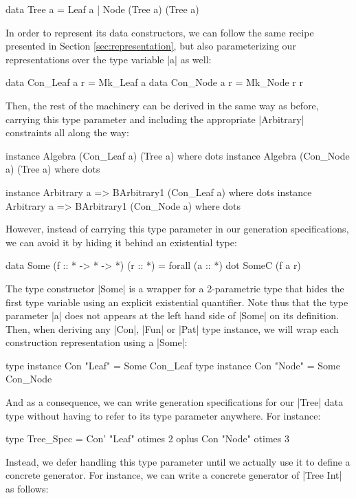 \begin{code}
data Tree a = Leaf a | Node (Tree a) (Tree a)
\end{code}

In order to represent its data constructors, we can follow the same recipe
presented in Section \ref{sec:representation}, but also parameterizing our
representations over the type variable |a| as well:

\begin{code}
data Con_Leaf a r = Mk_Leaf a
data Con_Node a r = Mk_Node r r
\end{code}

Then, the rest of the machinery can be derived in the same way as before,
carrying this type parameter and including the appropriate |Arbitrary|
constraints all along the way:

\begin{code}
instance Algebra (Con_Leaf a) (Tree a) where dots
instance Algebra (Con_Node a) (Tree a) where dots

instance Arbitrary a => BArbitrary1 (Con_Leaf a) where dots
instance Arbitrary a => BArbitrary1 (Con_Node a) where dots
\end{code}

%
However, instead of carrying this type parameter in our generation
specifications, we can avoid it by hiding it behind an existential type:

\begin{code}
data Some (f :: * -> * -> *) (r :: *) = forall (a :: *) dot SomeC (f a r)
\end{code}
%
The type constructor |Some| is a wrapper for a 2-parametric type that hides the
first type variable using an explicit existential quantifier.
%
Note thus that the type parameter |a| does not appears at the left hand side of
|Some| on its definition.
%
Then, when deriving any |Con|, |Fun| or |Pat| type instance, we will wrap each
construction representation using a |Some|:

\begin{code}
type instance Con "Leaf" = Some Con_Leaf
type instance Con "Node" = Some Con_Node
\end{code}
%
And as a consequence, we can write generation specifications for our |Tree| data
type without having to refer to its type parameter anywhere.
%
For instance:

\begin{code}
type Tree_Spec  =      Con'  "Leaf"  otimes 2
                oplus  Con   "Node"  otimes 3
\end{code}
%
Instead, we defer handling this type parameter until we actually use it to
define a concrete generator.
%
For instance, we can write a concrete generator of |Tree Int| as follows:

